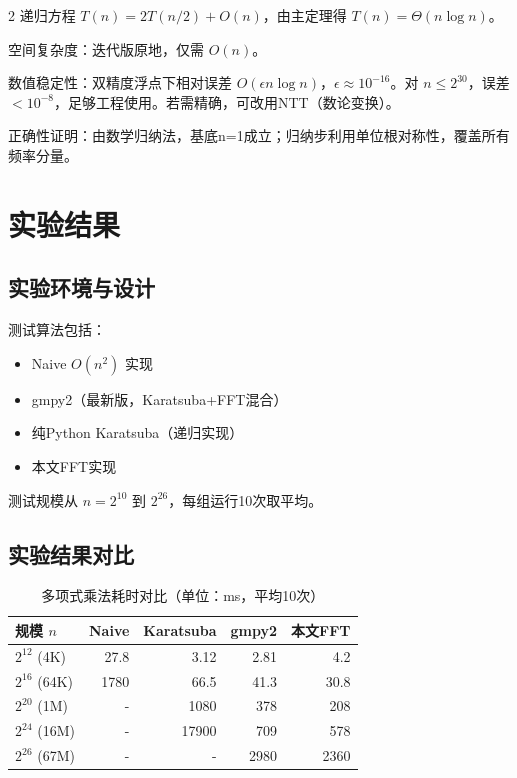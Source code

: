 \documentclass[10pt]{article}
\begin{document}
\begin{multicols}{2}
递归方程 $T(n) = 2T(n/2) + O(n)$，由主定理得 $T(n) = \Theta(n \log n)$。

空间复杂度：迭代版原地，仅需 $O(n)$。

数值稳定性：双精度浮点下相对误差 $O(\epsilon n \log n)$，$\epsilon \approx 10^{-16}$。对 $n \le 2^{30}$，误差 $<10^{-8}$，足够工程使用。若需精确，可改用NTT（数论变换）。

正确性证明：由数学归纳法，基底n=1成立；归纳步利用单位根对称性，覆盖所有频率分量。

\section{实验结果}

\subsection{实验环境与设计}

测试算法包括：
\begin{itemize}
    \item Naive $O(n^2)$ 实现
    \item gmpy2（最新版，Karatsuba+FFT混合）
    \item 纯Python Karatsuba（递归实现）
    \item 本文FFT实现
\end{itemize}

测试规模从 $n=2^{10}$ 到 $2^{26}$，每组运行10次取平均。

\subsection{实验结果对比}

\begin{table}[ht]
    \centering
    \caption{多项式乘法耗时对比（单位：ms，平均10次）}
    \begin{tabular}{lrrrr}
        \toprule
        规模 $n$ & Naive & Karatsuba & gmpy2 & 本文FFT \\
        \midrule
        $2^{12}$ (4K) & 27.8 & 3.12 & 2.81 & 4.2 \\
        $2^{16}$ (64K) & 1780 & 66.5 & 41.3 & 30.8 \\
        $2^{20}$ (1M) & - & 1080 & 378 & 208 \\
        $2^{24}$ (16M) & - & 17900 & 709 & 578 \\
        $2^{26}$ (67M) & - & - & 2980 & 2360 \\
        \bottomrule
    \end{tabular}
    \label{tab:time}
\end{table}


\end{multicols}
\end{document}
